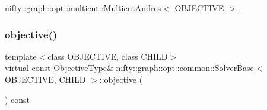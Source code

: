 \hyperlink{classnifty_1_1graph_1_1opt_1_1multicut_1_1MulticutAndres_ac7a32dbee9103beb72ba2cf6fcd6ecee}{nifty\+::graph\+::opt\+::multicut\+::\+Multicut\+Andres$<$ O\+B\+J\+E\+C\+T\+I\+V\+E $>$}.

\mbox{\label{classnifty_1_1graph_1_1opt_1_1common_1_1SolverBase_a55e9eb645c07d6e0782ebfb990ab3c84}} 
\subsubsection{\texorpdfstring{objective()}{objective()}}
{\footnotesize\ttfamily template$<$class O\+B\+J\+E\+C\+T\+I\+VE, class C\+H\+I\+LD$>$ \\
virtual const \hyperlink{classnifty_1_1graph_1_1opt_1_1common_1_1SolverBase_aac4861a6201ba3df7ef66ad5af0c65bd}{Objective\+Type}\& \hyperlink{classnifty_1_1graph_1_1opt_1_1common_1_1SolverBase}{nifty\+::graph\+::opt\+::common\+::\+Solver\+Base}$<$ O\+B\+J\+E\+C\+T\+I\+VE, C\+H\+I\+LD $>$\+::objective (\begin{DoxyParamCaption}{ }\end{DoxyParamCaption}) const\hspace{0.3cm}{\ttfamily [pure virtual]}}



